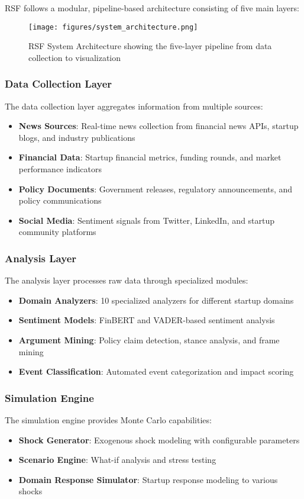 \documentclass[conference]{IEEEtran}
\begin{document}
RSF follows a modular, pipeline-based architecture consisting of five main layers:

\begin{figure}[H]
\centering
\texttt{[image: figures/system\_architecture.png]}
\caption{RSF System Architecture showing the five-layer pipeline from data collection to visualization}
\label{fig:system_architecture}
\end{figure}

\subsubsection{Data Collection Layer}
The data collection layer aggregates information from multiple sources:
\begin{itemize}
    \item \textbf{News Sources}: Real-time news collection from financial news APIs, startup blogs, and industry publications
    \item \textbf{Financial Data}: Startup financial metrics, funding rounds, and market performance indicators
    \item \textbf{Policy Documents}: Government releases, regulatory announcements, and policy communications
    \item \textbf{Social Media}: Sentiment signals from Twitter, LinkedIn, and startup community platforms
\end{itemize}

\subsubsection{Analysis Layer}
The analysis layer processes raw data through specialized modules:
\begin{itemize}
    \item \textbf{Domain Analyzers}: 10 specialized analyzers for different startup domains
    \item \textbf{Sentiment Models}: FinBERT and VADER-based sentiment analysis
    \item \textbf{Argument Mining}: Policy claim detection, stance analysis, and frame mining
    \item \textbf{Event Classification}: Automated event categorization and impact scoring
\end{itemize}

\subsubsection{Simulation Engine}
The simulation engine provides Monte Carlo capabilities:
\begin{itemize}
    \item \textbf{Shock Generator}: Exogenous shock modeling with configurable parameters
    \item \textbf{Scenario Engine}: What-if analysis and stress testing
    \item \textbf{Domain Response Simulator}: Startup response modeling to various shocks
\end{itemize}
\end{document}
